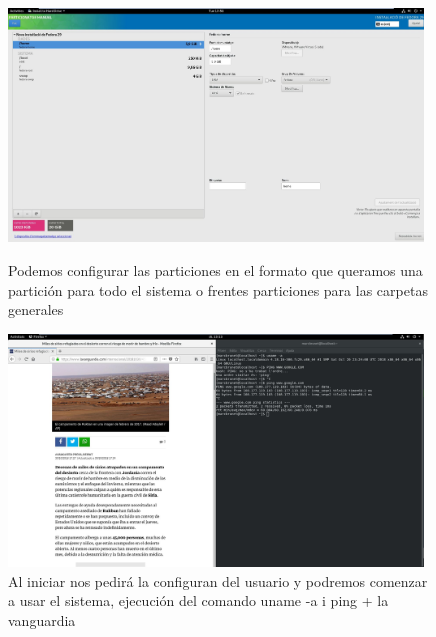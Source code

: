 \documentclass[preprint,11pt]{elsarticle}
\begin{document}
\begin{figure}[!htbp]
    \begin{center}
        \includegraphics[width=11cm]{anex/fedora3.JPG}
    \end{center}
    \caption{Podemos configurar las particiones en el formato que queramos una partición para todo el sistema o frentes particiones para las carpetas generales}
    \begin{center}
        \includegraphics[width=11cm]{anex/fedora4.JPG}
    \end{center}
    \caption{Al iniciar nos pedirá la configuran del usuario y podremos comenzar a usar el sistema, ejecución del comando uname -a i ping + la vanguardia }
\end{figure}
\end{document}
